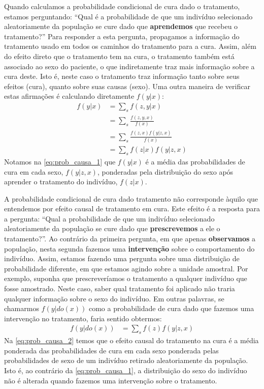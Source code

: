 Quando calculamos a probabilidade condicional
de cura dado o tratamento, estamos perguntando:
``Qual é a probabilidade de que um indivíduo selecionado
  aleatoriamente da população se cure dado que
  \textbf{aprendemos} que recebeu o tratamento?''
Para responder a esta pergunta, propagamos
a informação do tratamento usado em 
todos os caminhos do tratamento para a cura.
Assim, além do efeito direto que o tratamento tem na cura,
o tratamento também está associado ao sexo do paciente,
o que indiretamente traz mais informação sobre a cura deste.
Isto é, neste caso o tratamento traz informação
tanto sobre seus efeitos (cura), 
quanto sobre suas causas (sexo).
Uma outra maneira de verificar estas afirmações é
calculando diretamente $f(y|x)$:
\begin{align}
 \label{eq:prob_causa_1}
 f(y|x)
 &= \sum_s f(z,y|x) \nonumber \\
 &= \sum_s \frac{f(z,y,x)}{f(x)} \nonumber \\
 &= \sum_s \frac{f(z,x)f(y|z,x)}{f(x)} \nonumber \\
 &= \sum_s f(z|x)f(y|z,x)
\end{align}
Notamos na \cref{eq:prob_causa_1} que 
$f(y|x)$ é a média das probabilidades de cura em 
cada sexo, $f(y|z,x)$,
ponderadas pela distribuição do sexo
após aprender o tratamento do indivíduo, $f(z|x)$.

A probabilidade condicional de cura dado tratamento
não corresponde àquilo que entendemos por
efeito causal de tratamento em cura. 
Este efeito é a resposta para a pergunta:
``Qual a probabilidade de que um indivíduo selecionado
  aleatoriamente da população se cure dado que
  \textbf{prescrevemos} a ele o tratamento?''.
Ao contrário da primeira pergunta,
em que apenas \textbf{observamos} a população,
nesta segunda fazemos uma \textbf{intervenção} sobre
o comportamento do indivíduo.
Assim, estamos fazendo uma pergunta sobre 
uma distribuição de probabilidade diferente,
em que estamos agindo sobre a unidade amostral.
Por exemplo, suponha que prescreveríamos o tratamento
a qualquer indivíduo que fosse amostrado.
Neste caso, saber qual tratamento foi aplicado 
não traria qualquer informação sobre o sexo do indivíduo.
Em outras palavras, se chamarmos $f(y|do(x))$ como
a probabilidade de cura dado que fazemos uma intervenção no tratamento,
faria sentido obtermos:
\begin{align}
 \label{eq:prob_causa_2}
 f(y|do(x)) 
 &= \sum_s f(z)f(y|z,x)
\end{align}
Na \cref{eq:prob_causa_2} temos que o efeito causal 
do tratamento na cura é a média ponderada
das probabilidades de cura em cada sexo ponderada
pelas probabilidades de sexo 
de um indivíduo retirado aleatoriamente da população.
Isto é, ao contrário da \cref{eq:prob_causa_1},
a distribuição do sexo do indivíduo não é alterada quando
fazemos uma intervenção sobre o tratamento.


